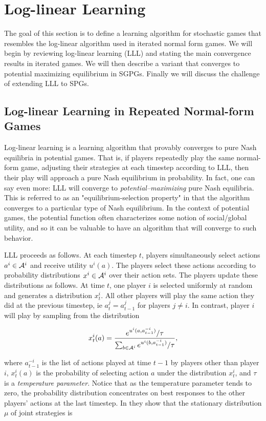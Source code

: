 
\section{Log-linear Learning}

The goal of this section is to define a learning algorithm for stochastic games that resembles the log-linear algorithm used in iterated normal form games. We will begin by reviewing log-linear learning (LLL) and stating the main convergence results in iterated games. We will then describe a variant that converges to potential maximizing equilibrium in SGPGs. Finally we will discuss the challenge of extending LLL to SPGs.

\subsection{Log-linear Learning in Repeated Normal-form Games}

Log-linear learning is a learning algorithm that provably converges to pure Nash equilibria in potential games. That is, if players repeatedly play the same normal-form game, adjusting their strategies at each timestep according to LLL, then their play will approach a pure Nash equilibrium in probability. In fact, one can say even more: LLL will converge to {\em potential--maximizing} pure Nash equilibria. This is referred to as an "equilibrium-selection property" in that the algorithm converges to a particular type of Nash equilibrium. In the context of potential games, the potential function often characterizes some notion of social/global utility, and so it can be valuable to have an algorithm that will converge to such behavior.

LLL proceeds as follows. At each timestep $t$, players simultaneously select actions $a^i \in \AA^i$ and receive utility $u^i(a)$. The players select these actions according to probability distributions $x^i \in \AA^i$ over their action sets. The players update these distributions as follows. At time $t$, one player $i$ is selected uniformly at random and generates a distribution $x^i_t$. All other players will play the same action they did at the previous timestep, ie $a_{t}^{j} = a_{t-1}^{j}$ for players $j \neq i$. In contrast, player $i$ will play by sampling from the distribution

$$
x^i_t(a) = \dfrac{e^{u^i(a, a_{t-1}^{-i})}/\tau}{\sum_{b \in \AA^i} e^{u^i(b, a_{t-1}^{-i})}/\tau},
$$

\noindent where $a_{t-1}^{-i}$ is the list of actions played at time $t-1$ by players other than player $i$, $x^i_t(a)$ is the probability of selecting action $a$ under the distribution $x^i_t$, and $\tau$ is a {\em temperature parameter}. Notice that as the temperature parameter tends to zero, the probability distribution concentrates on best responses to the other players' actions at the last timestep. In \cite{blume1993statistical} they show that the stationary distribution $\mu$ of joint strategies is

